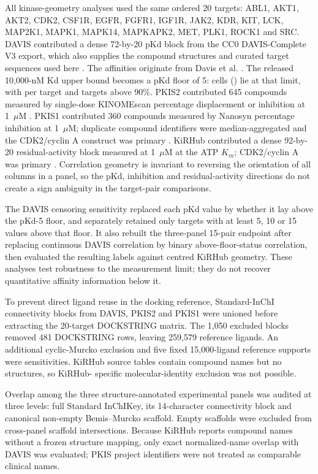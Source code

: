 \documentclass[11pt]{article}
\begin{document}
All kinase-geometry analyses used the same ordered 20 targets: ABL1, AKT1, AKT2, CDK2,
CSF1R, EGFR, FGFR1, IGF1R, JAK2, KDR, KIT, LCK, MAP2K1, MAPK1, MAPK14, MAPKAPK2, MET,
PLK1, ROCK1 and SRC. DAVIS contributed a dense 72-by-20 pKd block from the CC0
DAVIS-Complete V3 export, which also supplies the compound structures and curated target
sequences used here \cite{wu2025davis}. The affinities originate from Davis et al.
\cite{davis2011}. The released 10,000-nM Kd upper bound becomes a pKd floor of 5:
\DavisFloorCells{} cells (\DavisFloorPercent{}) lie at that limit, with
\DavisFloorRange{} per target and \DavisHighFloorTargets{} targets above 90\%.
PKIS2 contributed 645 compounds measured by single-dose KINOMEscan
percentage displacement or inhibition at 1~$\mu$M \cite{drewry2017}. PKIS1 contributed 360 compounds measured by Nanosyn percentage inhibition
at 1~$\mu$M; duplicate compound identifiers were median-aggregated and the CDK2/cyclin A
construct was primary \cite{elkins2016}. KiRHub contributed a dense 92-by-20 residual-activity block measured at
1~$\mu$M at the ATP $K_m$; CDK2/cyclin A was primary \cite{saifudeen2026}. Correlation geometry is invariant to reversing the orientation of all
columns in a panel, so the pKd, inhibition and residual-activity directions do not create a
sign ambiguity in the target-pair comparisons.

The DAVIS censoring sensitivity replaced each pKd value by whether it lay above the pKd-5
floor, and separately retained only targets with at least 5, 10 or 15 values above that
floor. It also rebuilt the three-panel 15-pair endpoint after replacing continuous DAVIS
correlation by binary above-floor-status correlation, then evaluated the resulting labels
against centred KiRHub geometry. These analyses test robustness to the measurement limit;
they do not recover quantitative affinity information below it.

To prevent direct ligand reuse in the docking reference, Standard-InChI connectivity blocks
from DAVIS, PKIS2 and PKIS1 were unioned before extracting the 20-target DOCKSTRING matrix.
The 1,050 excluded blocks removed 481 DOCKSTRING rows, leaving 259,579 reference ligands.
An additional cyclic-Murcko exclusion and five fixed 15,000-ligand reference supports were
sensitivities. KiRHub source tables contain compound names but no structures, so KiRHub-
specific molecular-identity exclusion was not possible.

Overlap among the three structure-annotated experimental panels was audited at three
levels: full Standard InChIKey, its 14-character connectivity block and canonical non-empty
Bemis--Murcko scaffold. Empty scaffolds were excluded from cross-panel scaffold
intersections. Because KiRHub reports compound names without a frozen structure mapping,
only exact normalized-name overlap with DAVIS was evaluated; PKIS project identifiers were
not treated as comparable clinical names.
\end{document}
